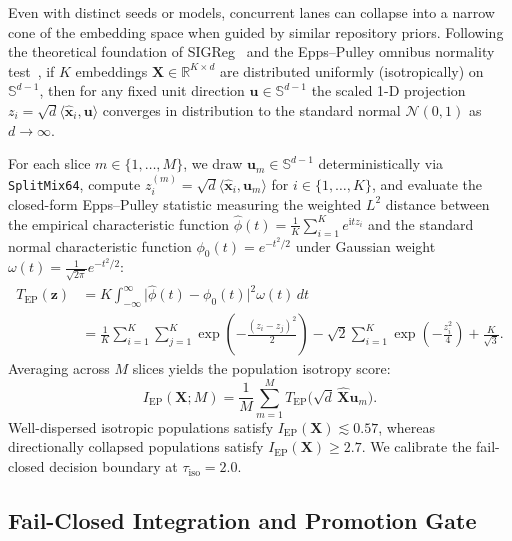 \documentclass[11pt]{article}
\begin{document}
Even with distinct seeds or models, concurrent lanes can collapse into a narrow cone of the embedding space when guided by similar repository priors. Following the theoretical foundation of SIGReg~\cite{klindt2025sigreg} and the Epps--Pulley omnibus normality test~\cite{epps1983test}, if $K$ embeddings $\mathbf{X} \in \mathbb{R}^{K \times d}$ are distributed uniformly (isotropically) on $\mathbb{S}^{d-1}$, then for any fixed unit direction $\mathbf{u} \in \mathbb{S}^{d-1}$ the scaled 1-D projection $z_i = \sqrt{d}\langle \hat{\mathbf{x}}_i, \mathbf{u} \rangle$ converges in distribution to the standard normal $\mathcal{N}(0, 1)$ as $d \to \infty$.

For each slice $m \in \{1, \dots, M\}$, we draw $\mathbf{u}_m \in \mathbb{S}^{d-1}$ deterministically via \texttt{SplitMix64}, compute $z^{(m)}_i = \sqrt{d}\langle \hat{\mathbf{x}}_i, \mathbf{u}_m \rangle$ for $i \in \{1, \dots, K\}$, and evaluate the closed-form Epps--Pulley statistic measuring the weighted $L^2$ distance between the empirical characteristic function $\hat{\phi}(t) = \frac{1}{K}\sum_{i=1}^K e^{\mathrm{i} t z_i}$ and the standard normal characteristic function $\phi_0(t) = e^{-t^2 / 2}$ under Gaussian weight $\omega(t) = \frac{1}{\sqrt{2\pi}}e^{-t^2/2}$:
\begin{align}
\label{eq:epps-pulley}
T_{\text{EP}}(\mathbf{z}) &= K \int_{-\infty}^{\infty} \bigl|\hat{\phi}(t) - \phi_0(t)\bigr|^2 \omega(t)\,dt \nonumber \\
&= \frac{1}{K}\sum_{i=1}^K \sum_{j=1}^K \exp\!\left(-\frac{(z_i - z_j)^2}{2}\right) - \sqrt{2}\sum_{i=1}^K \exp\!\left(-\frac{z_i^2}{4}\right) + \frac{K}{\sqrt{3}}.
\end{align}
Averaging across $M$ slices yields the population isotropy score:
\begin{equation}
\label{eq:sphere-isotropy}
I_{\text{EP}}(\mathbf{X}; M) = \frac{1}{M}\sum_{m=1}^M T_{\text{EP}}\bigl(\sqrt{d}\,\hat{\mathbf{X}}\mathbf{u}_m\bigr).
\end{equation}
Well-dispersed isotropic populations satisfy $I_{\text{EP}}(\mathbf{X}) \lesssim 0.57$, whereas directionally collapsed populations satisfy $I_{\text{EP}}(\mathbf{X}) \ge 2.7$. We calibrate the fail-closed decision boundary at $\tau_{\text{iso}} = 2.0$.

\subsection{Fail-Closed Integration and Promotion Gate}
\label{sec:gate}
\end{document}
